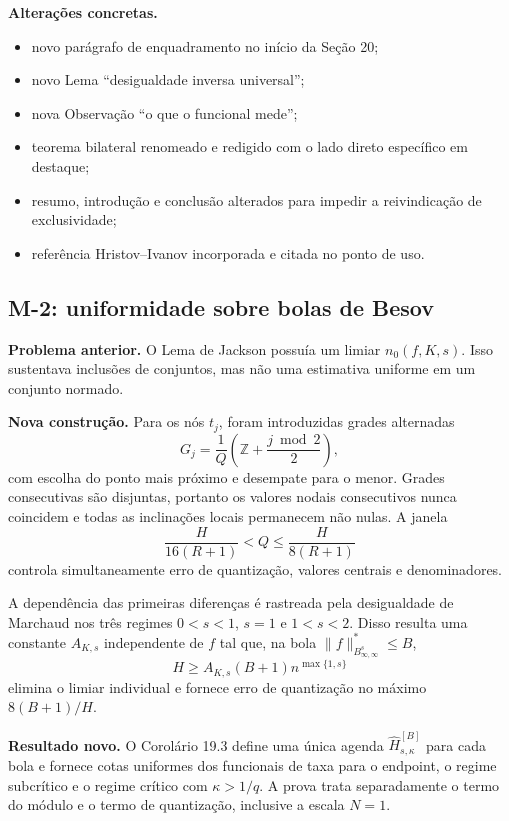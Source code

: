 \documentclass[11pt,a4paper]{article}
\begin{document}
\textbf{Alterações concretas.}
\begin{itemize}
  \item novo parágrafo de enquadramento no início da Seção 20;
  \item novo Lema ``desigualdade inversa universal'';
  \item nova Observação ``o que o funcional mede'';
  \item teorema bilateral renomeado e redigido com o lado direto específico em destaque;
  \item resumo, introdução e conclusão alterados para impedir a reivindicação de
  exclusividade;
  \item referência Hristov--Ivanov incorporada e citada no ponto de uso.
\end{itemize}

\subsection{M-2: uniformidade sobre bolas de Besov}

\textbf{Problema anterior.} O Lema de Jackson possuía um limiar
$n_0(f,K,s)$. Isso sustentava inclusões de conjuntos, mas não uma estimativa uniforme em
um conjunto normado.

\textbf{Nova construção.} Para os nós $t_j$, foram introduzidas grades alternadas
\[
 G_j=\frac1Q\left(\mathbb Z+\frac{j\bmod2}{2}\right),
\]
com escolha do ponto mais próximo e desempate para o menor. Grades consecutivas são
disjuntas, portanto os valores nodais consecutivos nunca coincidem e todas as inclinações
locais permanecem não nulas. A janela
\[
 \frac{H}{16(R+1)}<Q\leq\frac{H}{8(R+1)}
\]
controla simultaneamente erro de quantização, valores centrais e denominadores.

A dependência das primeiras diferenças é rastreada pela desigualdade de Marchaud nos três
regimes $0<s<1$, $s=1$ e $1<s<2$. Disso resulta uma constante
$A_{K,s}$ independente de $f$ tal que, na bola
$\|f\|_{B^s_{\infty,\infty}}^*\leq B$,
\[
 H\geq A_{K,s}(B+1)n^{\max\{1,s\}}
\]
elimina o limiar individual e fornece erro de quantização no máximo
$8(B+1)/H$.

\textbf{Resultado novo.} O Corolário 19.3 define uma única agenda
$\widehat H_{s,\kappa}^{[B]}$ para cada bola e fornece cotas uniformes dos
funcionais de taxa para o endpoint, o regime subcrítico e o regime crítico com
$\kappa>1/q$. A prova trata separadamente o termo do módulo e o termo de
quantização, inclusive a escala $N=1$.
\end{document}
